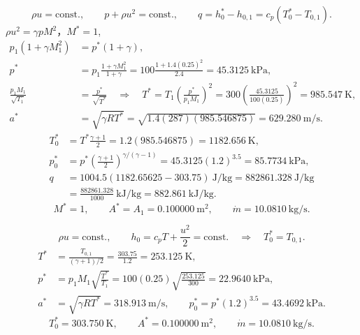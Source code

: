 \[
\rho u=\mathrm{const.},\qquad p+\rho u^2=\mathrm{const.},\qquad
q=h_0^*-h_{0,1}=c_p(T_0^*-T_{0,1}).
\]
$\rho u^2=\gamma pM^2，M^*=1$,
\begin{align*}
p_1(1+\gamma M_1^2)&=p^*(1+\gamma),\\
p^*&=p_1\frac{1+\gamma M_1^2}{1+\gamma}
=100\frac{1+1.4(0.25)^2}{2.4}=\boxed{45.3125~\mathrm{kPa}},\\
\frac{p_1M_1}{\sqrt{T_1}}&=\frac{p^*}{\sqrt{T^*}}
\quad\Longrightarrow\quad
T^*=T_1\left(\frac{p^*}{p_1M_1}\right)^2
=300\left(\frac{45.3125}{100(0.25)}\right)^2
=\boxed{985.547~\mathrm{K}},\\
a^*&=\sqrt{\gamma RT^*}=\sqrt{1.4(287)(985.546875)}
=\boxed{629.280~\mathrm{m/s}}.
\end{align*}
\begin{align*}
T_0^*&=T^*\frac{\gamma+1}{2}=1.2(985.546875)
=\boxed{1182.656~\mathrm{K}},\\
p_0^*&=p^*\left(\frac{\gamma+1}{2}\right)^{\gamma/(\gamma-1)}
=45.3125(1.2)^{3.5}=\boxed{85.7734~\mathrm{kPa}},\\
q&=1004.5(1182.65625-303.75)~\mathrm{J/kg}
=882861.328~\mathrm{J/kg}\\
&=\frac{882861.328}{1000}~\mathrm{kJ/kg}
=\boxed{882.861~\mathrm{kJ/kg}}.
\end{align*}
\[
\boxed{M^*=1,\qquad A^*=A_1=0.100000~\mathrm{m^2},\qquad
\dot m=10.0810~\mathrm{kg/s}.}
\]



\[
\rho u=\mathrm{const.},\qquad h_0=c_pT+\frac{u^2}{2}=\mathrm{const.}
\quad\Longrightarrow\quad T_0^*=T_{0,1}.
\]
\begin{align*}
T^*&=\frac{T_{0,1}}{(\gamma+1)/2}
=\frac{303.75}{1.2}=\boxed{253.125~\mathrm{K}},\\
p^*&=p_1M_1\sqrt{\frac{T^*}{T_1}}
=100(0.25)\sqrt{\frac{253.125}{300}}
=\boxed{22.9640~\mathrm{kPa}},\\
a^*&=\sqrt{\gamma RT^*}=\boxed{318.913~\mathrm{m/s}},\qquad
p_0^*=p^*(1.2)^{3.5}=\boxed{43.4692~\mathrm{kPa}}.
\end{align*}
\[
\boxed{T_0^*=303.750~\mathrm{K},\qquad A^*=0.100000~\mathrm{m^2},\qquad
\dot m=10.0810~\mathrm{kg/s}.}
\]




